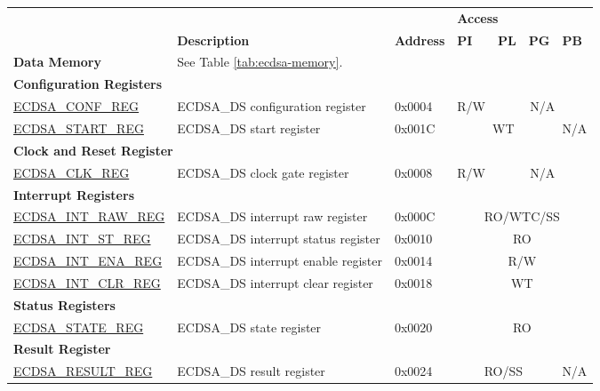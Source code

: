 \begin{longtable}{ | p{4.8cm} | l | p{1.3cm} | l | l | l | l | }
\hline
\rowcolor{lightgray}
 &  &   & \multicolumn{4}{|l|}{\textbf{Access}} \\\cline{4-7}
\rowcolor{lightgray}
\multirow{-2}{*}{\textbf{Name}} & \multirow{-2}{*}{\textbf{Description}}  &  \multirow{-2}{*}{\textbf{Address}} & \textbf{PI} & \textbf{PL} & \textbf{PG} & \textbf{PB} \\ \hline
\endhead
\textbf{Data Memory} & \multicolumn{6}{|l|}{See Table \ref{tab:ecdsa-memory}.} \\ \hline
\multicolumn{7}{|l|}{\textbf{Configuration Registers}} \\\hline
\hyperref[regdesc:ECDSACONFREG]{ECDSA\_CONF\_REG} & ECDSA\_DS configuration register & 0x0004 & R/W & \multicolumn{3}{|c|}{N/A} \\ \hline
\hyperref[regdesc:ECDSASTARTREG]{ECDSA\_START\_REG} & ECDSA\_DS start register & 0x001C & \multicolumn{3}{|c|}{WT} & N/A \\ \hline
\multicolumn{7}{|l|}{\textbf{Clock and Reset Register}} \\ \hline
\hyperref[regdesc:ECDSACLKREG]{ECDSA\_CLK\_REG} & ECDSA\_DS clock gate register & 0x0008 & R/W & \multicolumn{3}{|c|}{N/A} \\ \hline
\multicolumn{7}{|l|}{\textbf{Interrupt Registers}} \\ \hline
\hyperref[regdesc:ECDSAINTRAWREG]{ECDSA\_INT\_RAW\_REG} & ECDSA\_DS interrupt raw register & 0x000C & \multicolumn{4}{|c|}{RO/WTC/SS} \\ \hline
\hyperref[regdesc:ECDSAINTSTREG]{ECDSA\_INT\_ST\_REG} & ECDSA\_DS interrupt status register & 0x0010 & \multicolumn{4}{|c|}{RO} \\ \hline
\hyperref[regdesc:ECDSAINTENAREG]{ECDSA\_INT\_ENA\_REG} & ECDSA\_DS interrupt enable register & 0x0014 & \multicolumn{4}{|c|}{R/W} \\ \hline
\hyperref[regdesc:ECDSAINTCLRREG]{ECDSA\_INT\_CLR\_REG} & ECDSA\_DS interrupt clear register & 0x0018 & \multicolumn{4}{|c|}{WT} \\ \hline
\multicolumn{7}{|l|}{\textbf{Status Registers}} \\ \hline
\hyperref[regdesc:ECDSASTATEREG]{ECDSA\_STATE\_REG} & ECDSA\_DS state register & 0x0020 & \multicolumn{4}{|c|}{RO} \\ \hline
\multicolumn{7}{|l|}{\textbf{Result Register}} \\ \hline
\hyperref[regdesc:ECDSARESULTREG]{ECDSA\_RESULT\_REG} & ECDSA\_DS result register & 0x0024 & \multicolumn{3}{|c|}{RO/SS} & N/A \\ \hline

\end{longtable}
